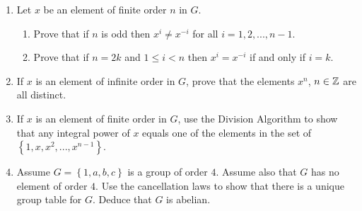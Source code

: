 \begin{enumerate}
		\item Let $x$ be an element of finite order $n$ in $G$.
		\begin{enumerate}
			\item Prove that if $n$ is odd then $x^i \neq x^{-i}$ for all $i =  1,2,...,n-1$.
			\item Prove that if $n = 2k$ and $1\leq i<n$ then $x^i = x^{-i}$ if and only if $i = k$.
		\end{enumerate}
		\item If $x$ is an element of infinite order in $G$, prove that the elements $x^n$, $n\in\mathbb{Z}$ are all distinct.
		\item If $x$ is an element of finite order in $G$, use the Division Algorithm to show that any integral power of $x$ equals one of the elements in the set of $\left\{ 1,x,x^2,...,x^{n-1} \right\}$.
		\item Assume $G = \left\{ 1,a,b,c \right\}$ is a group of order $4$.  Assume also that $G$ has no element of order $4$.  Use the cancellation laws to show that there is a unique group table for $G$.  Deduce that $G$ is abelian.
	\end{enumerate}
